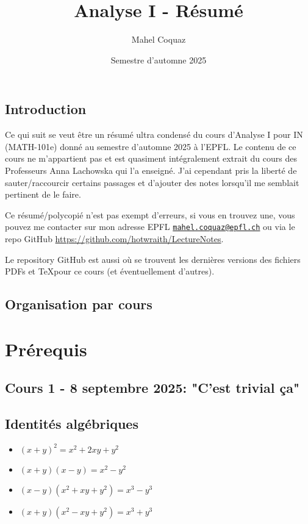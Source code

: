 \documentclass[10pt,a4paper]{book}
\title{Analyse I \vspace{0.2cm} - Résumé}
\author{Mahel Coquaz}
\date{Semestre d'automne 2025}
\begin{document}
\maketitle
\tableofcontents
\newpage

\section*{Introduction}

Ce qui suit se veut être un résumé ultra condensé du cours d'Analyse I pour IN (MATH-101e) donné au semestre d'automne 2025 à l'EPFL. Le contenu de ce cours ne m'appartient pas et est quasiment intégralement extrait du cours des Professeurs Anna Lachowska qui l'a enseigné. J'ai cependant pris la liberté de sauter/raccourcir certains passages et d'ajouter des notes lorsqu'il me semblait pertinent de le faire. \par
Ce résumé/polycopié n'est pas exempt d'erreurs, si vous en trouvez une, vous pouvez me contacter sur mon adresse EPFL \texttt{\href{mailto:mahel.coquaz@epfl.ch}{mahel.coquaz@epfl.ch}} ou via le repo GitHub \url{https://github.com/hotwraith/LectureNotes}. \par
Le repository GitHub est aussi où se trouvent les dernières versions des fichiers PDFs et \TeX pour ce cours (et éventuellement d'autres).

\newpage

\section*{Organisation par cours}

\title{}


\chapter{Prérequis} 
\section*{Cours 1 - 8 septembre 2025: "C'est trivial ça"} \label{lecture:1}

\fancyhead[L]{}

\section{Identités algébriques}

\begin{itemize}
\item $(x+y)^2 = x^2 + 2xy + y^2$
\item $(x+y)(x-y) = x^2-y^2$
\item $(x-y)(x^2+xy+y^2) = x^3-y^3$
\item $(x+y)(x^2-xy+y^2) = x^3+y^3$
\end{itemize}
\end{document}
